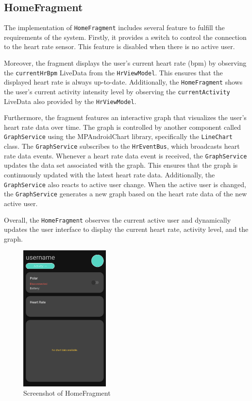\subsection{HomeFragment}
The implementation of \texttt{HomeFragment} includes several feature to fulfill the requirements of the system. 
Firstly, it provides a switch to control the connection to the heart rate sensor. This feature is disabled when there is no active user.

Moreover, the fragment displays the user's current heart rate (bpm) by observing the \texttt{currentHrBpm} LiveData from the \texttt{HrViewModel}. This ensures that the displayed heart rate is always up-to-date.
Additionally, the \texttt{HomeFragment} shows the user's current activity intensity level by observing the \texttt{currentActivity} LiveData also provided by the \texttt{HrViewModel}. 

Furthermore, the fragment features an interactive graph that visualizes the user's heart rate data over time. 
The graph is controlled by another component called \texttt{GraphService} using the MPAndroidChart library, specifically the \texttt{LineChart} class.
The \texttt{GraphService} subscribes to the \texttt{HrEventBus}, which broadcasts heart rate data events. 
Whenever a heart rate data event is received, the \texttt{GraphService} updates the data set associated with the graph. 
This ensures that the graph is continuously updated with the latest heart rate data.
Additionally, the \texttt{GraphService} also reacts to active user change. 
When the active user is changed, the \texttt{GraphService} generates a new graph based on the heart rate data of the new active user. 

Overall, the \texttt{HomeFragment} observes the current active user and dynamically updates the user interface to display the current heart rate, activity level, and the graph.
\begin{figure}[H]
    \centering
    \includegraphics[width=0.4\textwidth]{images/homefragment-screenshot.png}
    \caption{Screenshot of HomeFragment}
    \label{fig:homefragment_screenshot}
\end{figure}

